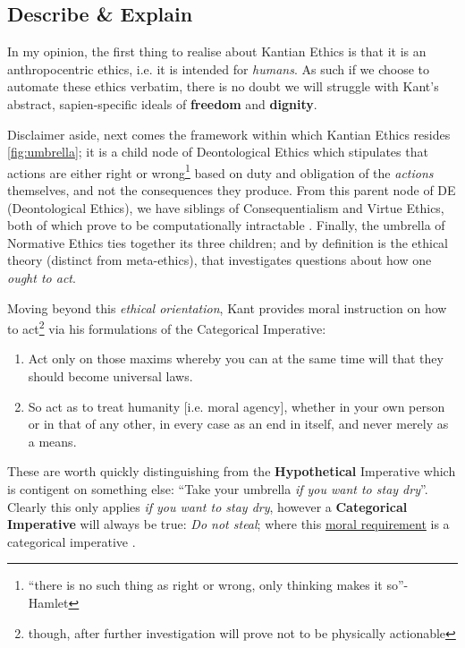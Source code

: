 \documentclass{scrartcl}
\begin{document}
\subsection{Describe \& Explain}
In my opinion, the first thing to realise about Kantian Ethics is that it is an \mbox{anthropocentric} ethics, i.e. it is intended for \emph{humans}. As such if we choose to automate these ethics verbatim, there is no doubt we will struggle with Kant's abstract, sapien-specific ideals of \textbf{freedom} and \textbf{dignity}.

Disclaimer aside, next comes the framework within which Kantian Ethics resides \ref{fig:umbrella}; it is a child node of Deontological Ethics which stipulates that actions are either right or wrong\footnote{``there is no such thing as right or wrong, only thinking makes it so''-Hamlet} based on duty and obligation of the \emph{actions} themselves, and not the consequences they produce. From this parent node of DE (Deontological Ethics), we have siblings of Consequentialism and Virtue Ethics, both of which prove to be computationally intractable \parencite{Manna2021, Powers2006}. Finally, the umbrella of Normative Ethics ties together its three children; and by definition is the ethical theory (distinct from meta-ethics), that investigates questions about how one \emph{ought to act}.

Moving beyond this \emph{ethical orientation}, Kant provides moral instruction on how to act\footnote{though, after further investigation will prove not to be physically actionable} via his formulations of the Categorical Imperative:

\begin{enumerate}
\item Act only on those maxims whereby you can at the same time will that they should become universal laws.\parencite{Kant1785p49}\label{CI1}
\item So act as to treat humanity [i.e. moral agency], whether in your own person or in that of any other, in every case as an end in itself, and never merely as a means.\parencite{Kant1785p58}\label{CI2}
\end{enumerate}

These are worth quickly distinguishing from the \textbf{Hypothetical} Imperative which is contigent on something else: \enquote{Take your umbrella \emph{if you want to stay dry}}. Clearly this only applies \emph{if you want to stay dry}, however a \textbf{Categorical Imperative} will always be true: \emph{Do not steal}; where this \underline{moral requirement} is a categorical imperative \parencite{Bennett2015-ch4to6}.
\end{document}
